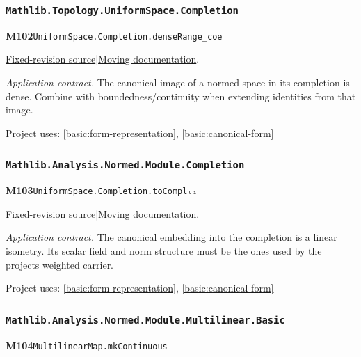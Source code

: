 \documentclass[11pt,a4paper]{article}
\theoremstyle{definition}
\theoremstyle{remark}
\begin{document}
\subsubsection*{\nolinkurl{Mathlib.Topology.UniformSpace.Completion}}
\noindent\textbf{M102}\label{base:M102}\quad\nolinkurl{UniformSpace.Completion.denseRange_coe}

\href{https://github.com/leanprover-community/mathlib4/blob/9bac2d0692944a775113f7c130fd5e5b4608a854/Mathlib/Topology/UniformSpace/Completion.lean}{Fixed-revision source}\quad|\quad\href{https://leanprover-community.github.io/mathlib4_docs/Mathlib/Topology/UniformSpace/Completion.html#UniformSpace.Completion.denseRange_coe}{Moving documentation}.\par
\noindent\textit{Application contract.} The canonical image of a normed space in its completion is dense. Combine with boundedness/continuity when extending identities from that image.\par
{\small Project uses: \ref{basic:form-representation}, \ref{basic:canonical-form}}\par\medskip

\subsubsection*{\nolinkurl{Mathlib.Analysis.Normed.Module.Completion}}
\noindent\textbf{M103}\label{base:M103}\quad\nolinkurl{UniformSpace.Completion.toComplₗᵢ}

\href{https://github.com/leanprover-community/mathlib4/blob/9bac2d0692944a775113f7c130fd5e5b4608a854/Mathlib/Analysis/Normed/Module/Completion.lean}{Fixed-revision source}\quad|\quad\href{https://leanprover-community.github.io/mathlib4_docs/Mathlib/Analysis/Normed/Module/Completion.html#UniformSpace.Completion.toComplₗᵢ}{Moving documentation}.\par
\noindent\textit{Application contract.} The canonical embedding into the completion is a linear isometry. Its scalar field and norm structure must be the ones used by the project\textquotesingle s weighted carrier.\par
{\small Project uses: \ref{basic:form-representation}, \ref{basic:canonical-form}}\par\medskip

\subsubsection*{\nolinkurl{Mathlib.Analysis.Normed.Module.Multilinear.Basic}}
\noindent\textbf{M104}\label{base:M104}\quad\nolinkurl{MultilinearMap.mkContinuous}
\end{document}
